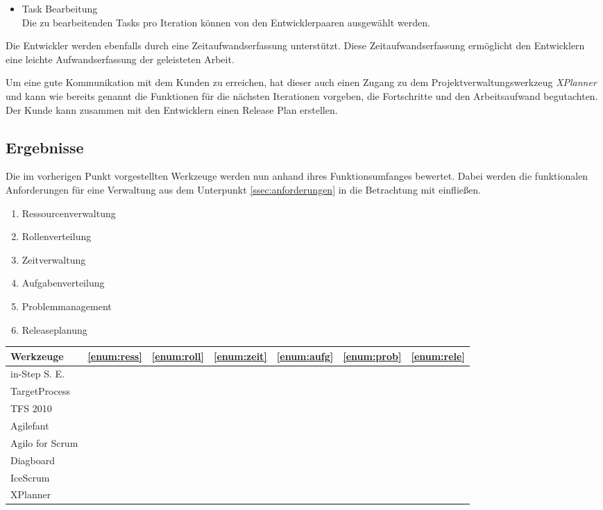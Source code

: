 \begin{description}
\begin{itemize}
\item Task Bearbeitung\\
Die zu bearbeitenden Tasks pro Iteration können von den Entwicklerpaaren ausgewählt werden. 
\end{itemize}

Die Entwickler werden ebenfalls durch eine Zeitaufwandserfassung unterstützt. Diese Zeitaufwandserfassung ermöglicht den Entwicklern eine leichte Aufwandserfassung der geleisteten Arbeit.

Um eine gute Kommunikation mit dem Kunden zu erreichen, hat dieser auch einen Zugang zu dem Projektverwaltungswerkzeug \emph{XPlanner} und kann wie bereits genannt die Funktionen für die nächsten Iterationen vorgeben, die Fortschritte und den Arbeitsaufwand begutachten. Der Kunde kann zusammen mit den Entwicklern einen Release Plan erstellen. \cite{bib:xplanner}

\end{description}

\subsection{Ergebnisse}
Die im vorherigen Punkt vorgestellten Werkzeuge werden nun anhand ihres Funktionsumfanges bewertet. Dabei werden die funktionalen Anforderungen für eine Verwaltung aus dem Unterpunkt \ref{ssec:anforderungen} in die Betrachtung mit einfließen.
\begin{enumerate}
\item Ressourcenverwaltung \label{enum:ress}
\item Rollenverteilung \label{enum:roll}
\item Zeitverwaltung \label{enum:zeit}
\item Aufgabenverteilung \label{enum:aufg}
\item Problemmanagement \label{enum:prob}
\item Releaseplanung \label{enum:rele}
\end{enumerate}

\begin{tabular}[h]{l|c|c|c|c|c|c}
\textbf{Werkzeuge} & \textbf{\ref{enum:ress}} & \textbf{\ref{enum:roll}} & \textbf{\ref{enum:zeit}} & \textbf{\ref{enum:aufg}} & \textbf{\ref{enum:prob}} & \textbf{\ref{enum:rele}}\\
\hline
in-Step S. E. & & & & & & \\
TargetProcess & & & & & & \\
TFS 2010 & & & & & & \\
\hline
Agilefant & & & & & & \\
Agilo for Scrum & & & & & & \\
Diagboard & & & & & & \\
IceScrum & & & & & & \\
XPlanner & & & & & & \\
\end{tabular}
